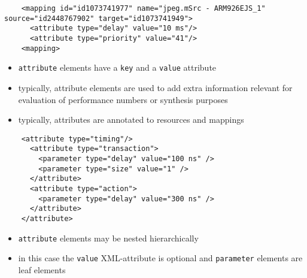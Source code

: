 \begin{frame}[fragile=singleslide]
\begin{lstlisting}
    <mapping id="id1073741977" name="jpeg.mSrc - ARM926EJS_1" source="id2448767902" target="id1073741949">
      <attribute type="delay" value="10 ms"/>
      <attribute type="priority" value="41"/>
    <mapping>
\end{lstlisting}
\begin{itemize}
\item \lstinline|attribute| elements have a \lstinline|key| and a \lstinline|value| attribute
\item typically, attribute elements are used to add extra information relevant for evaluation of performance numbers or synthesis purposes
\item typically, attributes are annotated to resources and mappings
\end{itemize}
\end{frame}


\begin{frame}[fragile=singleslide]
\begin{lstlisting}
    <attribute type="timing"/>
      <attribute type="transaction">
        <parameter type="delay" value="100 ns" />
        <parameter type="size" value="1" />
      </attribute>
      <attribute type="action">
        <parameter type="delay" value="300 ns" />
      </attribute>
    </attribute>
\end{lstlisting}

\begin{itemize}
\item \lstinline|attribute| elements may be nested hierarchically
\item in this case the \lstinline|value| XML-attribute is optional and \lstinline|parameter| elements are leaf elements
\end{itemize}

\end{frame}
